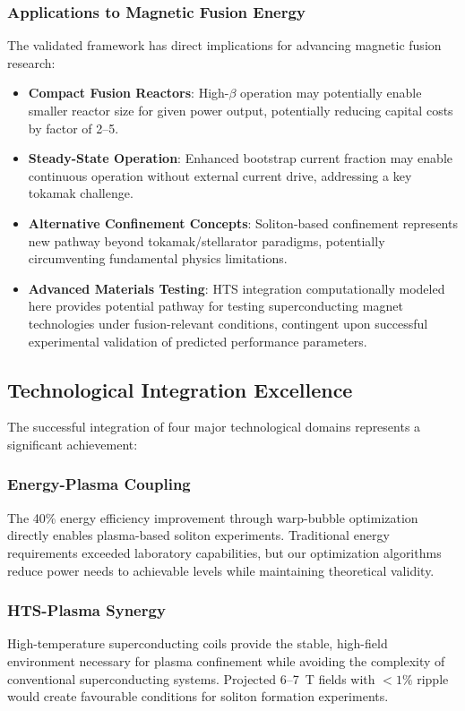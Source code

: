 \documentclass[10pt,twocolumn]{article}
\begin{document}
\subsubsection{Applications to Magnetic Fusion Energy}

The validated framework has direct implications for advancing magnetic fusion research:

\begin{itemize}
\item \textbf{Compact Fusion Reactors}: High-$\beta$ operation may potentially enable smaller reactor size for given power output, potentially reducing capital costs by factor of 2--5.
\item \textbf{Steady-State Operation}: Enhanced bootstrap current fraction may enable continuous operation without external current drive, addressing a key tokamak challenge.
\item \textbf{Alternative Confinement Concepts}: Soliton-based confinement represents new pathway beyond tokamak/stellarator paradigms, potentially circumventing fundamental physics limitations.
\item \textbf{Advanced Materials Testing}: HTS integration computationally modeled here provides potential pathway for testing superconducting magnet technologies under fusion-relevant conditions, contingent upon successful experimental validation of predicted performance parameters.
\end{itemize}

\subsection{Technological Integration Excellence}

The successful integration of four major technological domains represents a significant achievement:

\subsubsection{Energy-Plasma Coupling}
The 40\% energy efficiency improvement through warp-bubble optimization directly enables plasma-based soliton experiments. Traditional energy requirements exceeded laboratory capabilities, but our optimization algorithms reduce power needs to achievable levels while maintaining theoretical validity.

\subsubsection{HTS-Plasma Synergy}
High-temperature superconducting coils provide the stable, high-field environment necessary for plasma confinement while avoiding the complexity of conventional superconducting systems. Projected 6--7~T fields with $<1\%$ ripple would create favourable conditions for soliton formation experiments.
\end{document}
